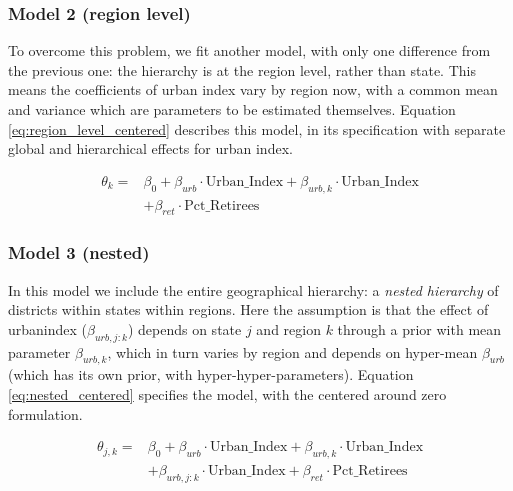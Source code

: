 \documentclass[12pt]{article}
\begin{document}
\subsubsection*{Model 2 (region level)}


To overcome this problem, we fit another model, with only one difference from the previous one: the hierarchy is at the region level, rather than state. This means the coefficients of urban index vary by region now, with a common mean and variance which are parameters to be estimated themselves.
Equation \ref{eq:region_level_centered} describes this model, in its specification with separate global and hierarchical effects for urban index.


\begin{equation} \label{eq:region_level_centered}
	\begin{aligned}
		\theta_{k} =    &\beta_0 + \beta_{urb} \cdot \text{Urban\_Index} + \beta_{urb,k} \cdot \text{Urban\_Index} \\
		&+ \beta_{ret} \cdot \text{Pct\_Retirees}
	\end{aligned}
\end{equation}


\subsubsection*{Model 3 (nested)}


In this model we include the entire geographical hierarchy: a \textit{nested hierarchy} of districts within states within regions.
Here the assumption is that the effect of urbanindex ($\beta_{urb, j:k}$) depends on state $j$ and region $k$ through a prior with mean parameter $\beta_{urb, k}$, which in turn varies by region and depends on hyper-mean $\beta_{urb}$ (which has its own prior, with hyper-hyper-parameters). Equation \ref{eq:nested_centered} specifies the model, with the centered around zero formulation. 

\begin{equation} \label{eq:nested_centered}
	\begin{aligned}
		\theta_{j,k} =    &\beta_0 + \beta_{urb} \cdot \text{Urban\_Index} + \beta_{urb,k} \cdot \text{Urban\_Index} \\
		&+ \beta_{urb,j:k} \cdot \text{Urban\_Index} + \beta_{ret} \cdot \text{Pct\_Retirees}
	\end{aligned}
\end{equation}
\end{document}
